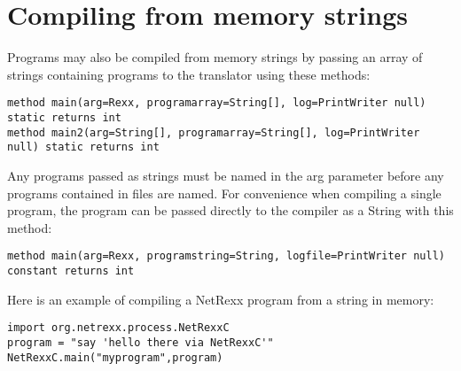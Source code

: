 {\section{Compiling from memory strings}
Programs may also be compiled from memory strings by passing an array
of strings containing programs to the translator using these methods:

\begin{lstlisting}[label=frommemory,caption=From Memory]
method main(arg=Rexx, programarray=String[], log=PrintWriter null) static returns int
method main2(arg=String[], programarray=String[], log=PrintWriter null) static returns int
\end{lstlisting}

Any programs passed as strings must be named in the arg parameter before any programs contained in files are named.
For convenience when compiling a single program, the program can be
passed directly to the compiler as a String with this method:

\begin{lstlisting}[label=string,caption=With String argument]
method main(arg=Rexx, programstring=String, logfile=PrintWriter null) constant returns int
\end{lstlisting}

Here is an example of compiling a NetRexx program from a string in
memory:

\begin{lstlisting}[label=memexample,caption=Example of compiling from String]
import org.netrexx.process.NetRexxC
program = "say 'hello there via NetRexxC'"
NetRexxC.main("myprogram",program)
\end{lstlisting}

}
